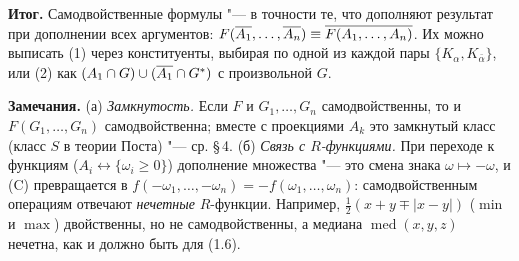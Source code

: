 \begin{solution}[2 (\S\,3)]
\textbf{Итог.} Самодвойственные формулы "--- в точности те, что
дополняют результат при дополнении всех аргументов:
$F(\overline{A_1},\dots,\overline{A_n})\equiv\overline{F(A_1,\dots,A_n)}$. Их можно выписать
(1) через конституенты, выбирая по одной из каждой пары
$\{K_\alpha,K_{\bar\alpha}\}$, или (2) как
$(A_1\cap G)\cup(\overline{A_1}\cap G^*)$ с произвольной $G$.

\textbf{Замечания.} (а) \emph{Замкнутость.} Если $F$ и $G_1,\dots,G_n$
самодвойственны, то и $F(G_1,\dots,G_n)$ самодвойственна; вместе
с проекциями $A_k$ это замкнутый класс (класс $S$ в теории Поста) "---
ср. \S\,4. (б) \emph{Связь с $R$-функциями.} При переходе к функциям
($A_i\leftrightarrow\{\omega_i\ge0\}$) дополнение множества "--- это смена
знака $\omega\mapsto-\omega$, и (C) превращается в
$f(-\omega_1,\dots,-\omega_n)=-f(\omega_1,\dots,\omega_n)$:
самодвойственным операциям отвечают \emph{нечетные} $R$-функции.
Например, $\tfrac12(x+y\mp|x-y|)$ ($\min$ и $\max$) двойственны, но не
самодвойственны, а медиана $\operatorname{med}(x,y,z)$ нечетна, как
и должно быть для (1.6).
\end{solution}

